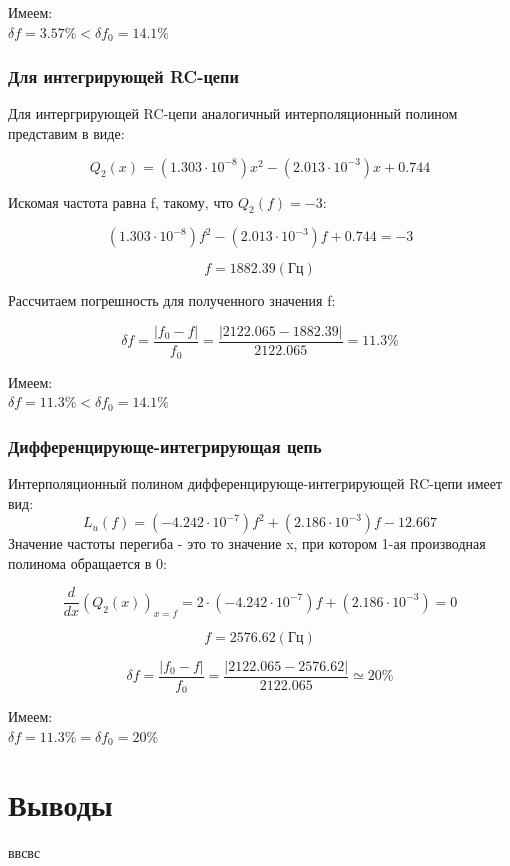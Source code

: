Имеем:\\
$\delta f = 3.57 \% < \delta f_0 = 14.1\%$

\subsubsection{Для интегрирующей RC-цепи}
Для интергрирующей RC-цепи аналогичный интерполяционный полином представим в виде:

\begin{equation}
Q_2(x) = (1.303 \cdot 10^{-8})x^2 - (2.013 \cdot 10^{-3})x + 0.744
\end{equation}

Искомая частота равна f, такому, что $Q_2(f) = -3$:

\begin{equation}
(1.303 \cdot 10^{-8})f^2 - (2.013 \cdot 10^{-3})f + 0.744 = -3
\end{equation}

\begin{equation}
f = 1882.39 (\text{Гц})
\end{equation}

Рассчитаем погрешность для полученного значения f:

\begin{equation}
\delta f = \frac{|f_0 - f|}{f_0} = \frac{|2122.065 - 1882.39|}{2122.065} = 11.3 \% 
\end{equation}

Имеем:\\
$\delta f = 11.3 \% < \delta f_0 = 14.1\%$

\subsubsection{Дифференцирующе-интегрирующая цепь}
Интерполяционный полином дифференцирующе-интегрирующей RC-цепи имеет вид:
\begin{equation}
L_u(f) = (-4.242 \cdot 10^{-7})f^2 + (2.186 \cdot 10^{-3})f -12.667
\end{equation}
Значение частоты перегиба - это то значение x, при котором 1-ая производная полинома обращается в 0:

\begin{equation}
\frac{d}{dx} (Q_2(x))_{x=f} = 2 \cdot (-4.242 \cdot 10^{-7})f + (2.186 \cdot 10^{-3}) = 0
\end{equation}

\begin{equation}
f = 2576.62 (\text{Гц})
\end{equation}

\begin{equation}
\delta f = \frac{|f_0 - f|}{f_0} = \frac{|2122.065 - 2576.62|}{2122.065} \simeq 20 \% 
\end{equation}

Имеем:\\
$\delta f = 11.3 \% = \delta f_0 = 20\%$
  
\section{Выводы}
ввсвс

